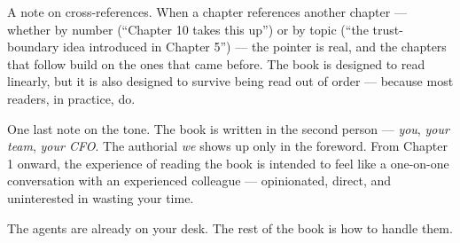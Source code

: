 A note on cross-references. When a chapter references another chapter --- whether by number (``Chapter 10 takes this up'') or by topic (``the trust-boundary idea introduced in Chapter 5'') --- the pointer is real, and the chapters that follow build on the ones that came before. The book is designed to read linearly, but it is also designed to survive being read out of order --- because most readers, in practice, do.

One last note on the tone. The book is written in the second person --- \textit{you}, \textit{your team}, \textit{your CFO}. The authorial \textit{we} shows up only in the foreword. From Chapter 1 onward, the experience of reading the book is intended to feel like a one-on-one conversation with an experienced colleague --- opinionated, direct, and uninterested in wasting your time.

The agents are already on your desk. The rest of the book is how to handle them.

\stoptwocol
